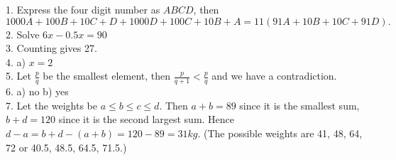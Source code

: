 \documentclass[a4paper,12pt,addpoints]{exam}
\begin{document}
    

\pagebreak

1. Express the four digit number as $ABCD$, then $$1000A + 100B + 10C + D + 1000D + 100C + 10B + A = 11(91A + 10B + 10C + 91D).$$ 
2. Solve $6x-0.5x=90$ \\
3. Counting gives 27. \\
4. a) $x=2$ \\
5. Let $\frac{p}{q}$ be the smallest element, then $\frac{p}{q+1} < \frac{p}{q}$ and we have a contradiction. \\
6. a) no b) yes\\
7. Let the weights be $a \le b \le c \le d$. Then $a + b = 89$ since it
is the smallest sum, $b + d = 120$ since it is the second largest sum. Hence
$d - a = b + d - (a + b) = 120 - 89 = 31kg$.
(The possible weights are 41, 48, 64, 72 or 40.5, 48.5, 64.5, 71.5.)




\end{document}
